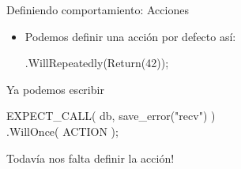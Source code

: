 \begin{frame}[t]{Definiendo comportamiento: Acciones}
\begin{itemize}
{\begin{itemize}
				\begin{center} .WillOnce(Return(42)).WillOnce(Return(42)); \end{center}
			\item Podemos definir una acci\'on por defecto as\'i:
				\begin{center} .WillRepeatedly(Return(42)); \end{center}
			\end{itemize}
		}
	 {
		\item Ya podemos escribir \\
			\begin{center}
			EXPECT\_CALL( db, save\_error("recv") ) \\
				\alert{.WillOnce(} ACTION \alert{)};
			\end{center}
		\item Todav\'ia nos falta definir la acci\'on!
	}
\end{itemize}
\end{frame}


